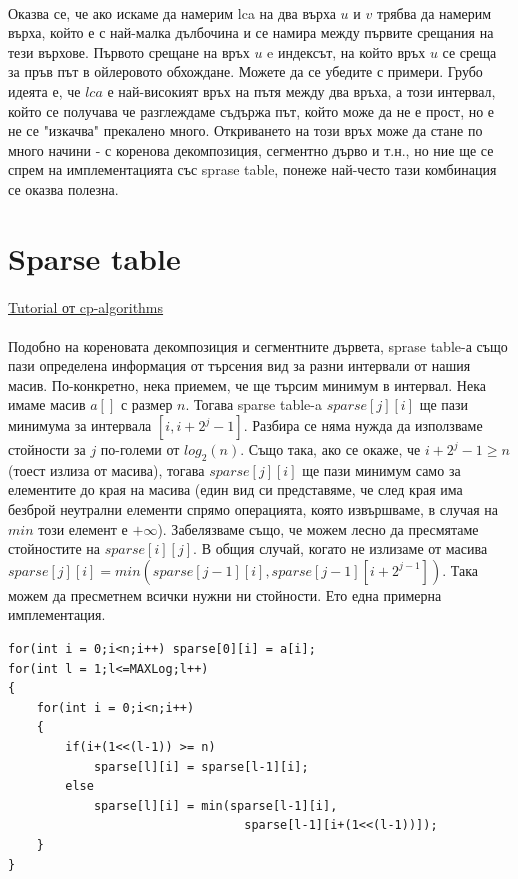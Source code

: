 \documentclass[12pt]{article}
\begin{document}
\paragraph*{}
Оказва се, че ако искаме да намерим lca на два върха $u$ и $v$ трябва да намерим върха, който е с най-малка дълбочина и се намира между първите срещания на тези върхове. Първото срещане на връх $u$  e индексът, на който връх $u$ се среща за пръв път в ойлеровото обхождане. Можете да се убедите с примери. Грубо идеята е, че $lca$ е най-високият връх на пътя между два връха, а този интервал, който се получава че разглеждаме съдържа път, който може да не е прост, но е не се "изкачва" прекалено много. Откриването на този връх може да стане по много начини - с коренова декомпозиция, сегментно дърво и т.н., но ние ще се спрем на имплементацията със sprase table, понеже най-често тази комбинация се оказва полезна.

\section*{Sparse table}
\paragraph*{}
\href{https://cp-algorithms.com/data_structures/sparse-table.html}{Tutorial от cp-algorithms}
\paragraph*{}
Подобно на кореновата декомпозиция и сегментните дървета, sprase table-а също пази определена информация от търсения вид за разни интервали от нашия масив. По-конкретно, нека приемем, че ще търсим минимум в интервал. Нека имаме масив $a[]$ с размер $n$. Тогава sparse table-a $sparse[j][i]$ ще пази минимума за интервала $[i, i+2^j-1]$. Разбира се няма нужда да използваме стойности за $j$ по-големи от $log_2(n)$. Също така, ако се окаже, че $i+2^j-1 \geq n$ (тоест излиза от масива), тогава $sparse[j][i]$ ще пази минимум само за елементите до края на масива (един вид си представяме, че след края има безброй неутрални елементи спрямо операцията, която извършваме, в случая на $min$ този елемент е $+\infty$). Забелязваме също, че можем лесно да пресмятаме стойностите на $sparse[i][j]$. В общия случай, когато не излизаме от масива $sparse[j][i] = min(sparse[j-1][i], sparse[j-1][i+2^{j-1}])$. Така можем да пресметнем всички нужни ни стойности. Ето една примерна имплементация. 
\begin{lstlisting}
for(int i = 0;i<n;i++) sparse[0][i] = a[i];
for(int l = 1;l<=MAXLog;l++)
{
	for(int i = 0;i<n;i++)
	{
		if(i+(1<<(l-1)) >= n)
			sparse[l][i] = sparse[l-1][i];
		else
			sparse[l][i] = min(sparse[l-1][i], 
			                     sparse[l-1][i+(1<<(l-1))]);
	}
}
\end{lstlisting}
\end{document}
